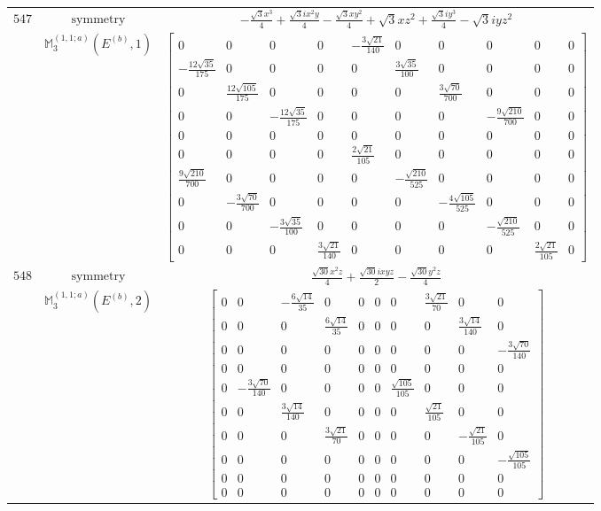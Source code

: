 \documentclass[fleqn,8pt,landscape]{jsarticle}
\begin{document}
\begin{longtable}{ccc}
$ 547 $ & $ \text{symmetry} $ & $ - \frac{\sqrt{3} x^{3}}{4} + \frac{\sqrt{3} i x^{2} y}{4} - \frac{\sqrt{3} x y^{2}}{4} + \sqrt{3} x z^{2} + \frac{\sqrt{3} i y^{3}}{4} - \sqrt{3} i y z^{2} $ \\
$  $ & $ \mathbb{M}_{3}^{(1,1;a)}(E^{(b)},1) $ & $ \begin{bmatrix} 0 & 0 & 0 & 0 & - \frac{3 \sqrt{21}}{140} & 0 & 0 & 0 & 0 & 0 \\ - \frac{12 \sqrt{35}}{175} & 0 & 0 & 0 & 0 & \frac{3 \sqrt{35}}{100} & 0 & 0 & 0 & 0 \\ 0 & \frac{12 \sqrt{105}}{175} & 0 & 0 & 0 & 0 & \frac{3 \sqrt{70}}{700} & 0 & 0 & 0 \\ 0 & 0 & - \frac{12 \sqrt{35}}{175} & 0 & 0 & 0 & 0 & - \frac{9 \sqrt{210}}{700} & 0 & 0 \\ 0 & 0 & 0 & 0 & 0 & 0 & 0 & 0 & 0 & 0 \\ 0 & 0 & 0 & 0 & \frac{2 \sqrt{21}}{105} & 0 & 0 & 0 & 0 & 0 \\ \frac{9 \sqrt{210}}{700} & 0 & 0 & 0 & 0 & - \frac{\sqrt{210}}{525} & 0 & 0 & 0 & 0 \\ 0 & - \frac{3 \sqrt{70}}{700} & 0 & 0 & 0 & 0 & - \frac{4 \sqrt{105}}{525} & 0 & 0 & 0 \\ 0 & 0 & - \frac{3 \sqrt{35}}{100} & 0 & 0 & 0 & 0 & - \frac{\sqrt{210}}{525} & 0 & 0 \\ 0 & 0 & 0 & \frac{3 \sqrt{21}}{140} & 0 & 0 & 0 & 0 & \frac{2 \sqrt{21}}{105} & 0 \end{bmatrix} $ \\ \hline
$ 548 $ & $ \text{symmetry} $ & $ \frac{\sqrt{30} x^{2} z}{4} + \frac{\sqrt{30} i x y z}{2} - \frac{\sqrt{30} y^{2} z}{4} $ \\
$  $ & $ \mathbb{M}_{3}^{(1,1;a)}(E^{(b)},2) $ & $ \begin{bmatrix} 0 & 0 & - \frac{6 \sqrt{14}}{35} & 0 & 0 & 0 & 0 & \frac{3 \sqrt{21}}{70} & 0 & 0 \\ 0 & 0 & 0 & \frac{6 \sqrt{14}}{35} & 0 & 0 & 0 & 0 & \frac{3 \sqrt{14}}{140} & 0 \\ 0 & 0 & 0 & 0 & 0 & 0 & 0 & 0 & 0 & - \frac{3 \sqrt{70}}{140} \\ 0 & 0 & 0 & 0 & 0 & 0 & 0 & 0 & 0 & 0 \\ 0 & - \frac{3 \sqrt{70}}{140} & 0 & 0 & 0 & 0 & \frac{\sqrt{105}}{105} & 0 & 0 & 0 \\ 0 & 0 & \frac{3 \sqrt{14}}{140} & 0 & 0 & 0 & 0 & \frac{\sqrt{21}}{105} & 0 & 0 \\ 0 & 0 & 0 & \frac{3 \sqrt{21}}{70} & 0 & 0 & 0 & 0 & - \frac{\sqrt{21}}{105} & 0 \\ 0 & 0 & 0 & 0 & 0 & 0 & 0 & 0 & 0 & - \frac{\sqrt{105}}{105} \\ 0 & 0 & 0 & 0 & 0 & 0 & 0 & 0 & 0 & 0 \\ 0 & 0 & 0 & 0 & 0 & 0 & 0 & 0 & 0 & 0 \end{bmatrix} $ \\ \hline
\end{longtable}
\end{document}
